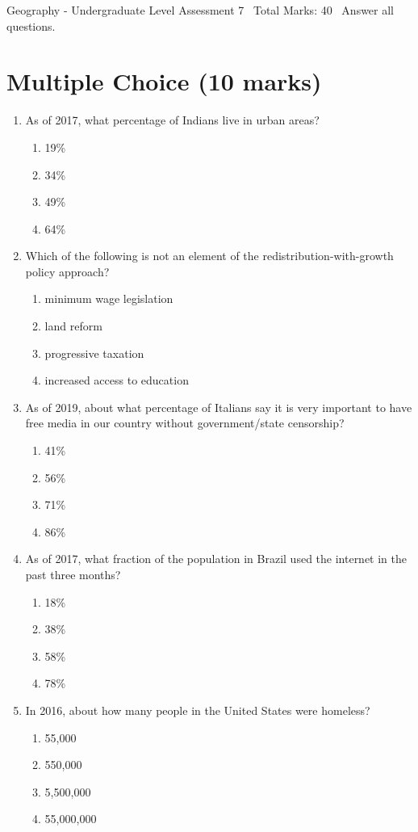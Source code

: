 \documentclass[12pt]{article}
\begin{document}
\begin{center}
Geography - Undergraduate Level Assessment 7 \
Total Marks: 40 \
Answer all questions.
\end{center}

\section*{Multiple Choice (10 marks)}
\begin{enumerate}[label=\arabic*.]
\item As of 2017, what percentage of Indians live in urban areas?
\begin{enumerate}[label=(\alph*)]
    \item 19\%
    \item 34\%
    \item 49\%
    \item 64\%
\end{enumerate}
\item Which of the following is not an element of the redistribution-with-growth policy approach?
\begin{enumerate}[label=(\alph*)]
    \item minimum wage legislation
    \item land reform
    \item progressive taxation
    \item increased access to education
\end{enumerate}
\item As of 2019, about what percentage of Italians say it is very important to have free media in our country without government/state censorship?
\begin{enumerate}[label=(\alph*)]
    \item 41\%
    \item 56\%
    \item 71\%
    \item 86\%
\end{enumerate}
\item As of 2017, what fraction of the population in Brazil used the internet in the past three months?
\begin{enumerate}[label=(\alph*)]
    \item 18\%
    \item 38\%
    \item 58\%
    \item 78\%
\end{enumerate}
\item In 2016, about how many people in the United States were homeless?
\begin{enumerate}[label=(\alph*)]
    \item 55,000
    \item 550,000
    \item 5,500,000
    \item 55,000,000
\end{enumerate}
\end{enumerate}
\end{document}

